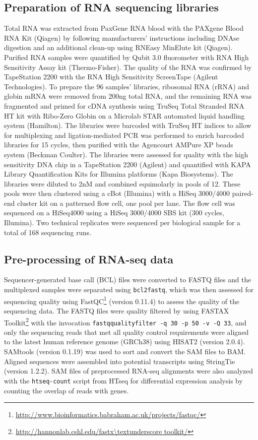 \subsection{Preparation of RNA sequencing libraries}

Total RNA was extracted from PaxGene RNA blood with the PAXgene Blood RNA Kit (Qiagen) by following manufacturers’ instructions including DNAse digestion and an additional clean-up using RNEasy MinElute kit (Qiagen). Purified RNA samples were quantified by Qubit 3.0 fluorometer with RNA High Sensitivity Assay kit (Thermo-Fisher). The quality of the RNA was confirmed by TapeStation 2200 with the RNA High Sensitivity ScreenTape (Agilent Technologies). To prepare the 96 samples’ libraries, ribosomal RNA (rRNA) and globin mRNA were removed from 200ng total RNA, and the remaining RNA was fragmented and primed for cDNA synthesis using TruSeq Total Stranded RNA HT kit with Ribo-Zero Globin on a Microlab STAR automated liquid handling system (Hamilton). The libraries were barcoded with TruSeq HT indices to allow for multiplexing and ligation-mediated PCR was performed to enrich barcoded libraries for 15 cycles, then purified with the Agencourt AMPure XP beads system (Beckman Coulter). The libraries were assessed for quality with the high sensitivity DNA chip in a TapeStation 2200 (Agilent) and quantified with KAPA Library Quantification Kits for Illumina platforms (Kapa Biosystems). The libraries were diluted to 2nM and combined equimolarly in pools of 12. These pools were then clustered using a cBot (Illumina) with a HiSeq 3000/4000 paired-end cluster kit on a patterned flow cell, one pool per lane. The flow cell was sequenced on a HiSeq4000 using a HiSeq 3000/4000 SBS kit (300 cycles, Illumina). Two technical replicates were sequenced per biological sample for a total of 168 sequencing runs.

\subsection{Pre-processing of RNA-seq data}

Sequencer-generated base call (BCL) files were converted to FASTQ files and the multiplexed samples were separated using \texttt{bcl2fastq}, which was then assessed for sequencing quality using FastQC\footnote{\url{http://www.bioinformatics.babraham.ac.uk/projects/fastqc/}} (version 0.11.4) to assess the quality of the sequencing data. The FASTQ files were quality filtered by using FASTAX Toolkit\footnote{\url{http://hannonlab.cshl.edu/fastx\textunderscore toolkit/}} with the invocation \texttt{fastq\textunderscore quality\textunderscore filter -q 30 -p 50 -v -Q 33}, and only the sequencing reads that met all quality control requirements were aligned to the latest human reference genome (GRCh38) using HISAT2\autocite{Kim2015} (version 2.0.4). SAMtools\autocite{Li2009} (version 0.1.19) was used to sort and convert the SAM files to BAM. Aligned sequences were assembled into potential transcripts using StringTie\autocite{Pertea2015} (version 1.2.2). SAM files of preprocessed RNA-seq alignments were also analyzed with the \texttt{htseq-count} script from HTseq\autocite{Anders2015} for differential expression analysis by counting the overlap of reads with genes.

